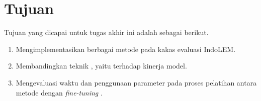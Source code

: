 \section{Tujuan}
\label{sec:tujuan}

Tujuan yang  dicapai untuk tugas akhir ini adalah sebagai berikut.

\begin{enumerate}
    \item Mengimplementasikan berbagai metode \PEFT pada kakas evaluasi IndoLEM.
    \item Membandingkan teknik \PEFT, yaitu \methodPEFT terhadap kinerja model.
    \item Mengevaluasi waktu dan penggunaan parameter pada proses pelatihan antara metode \PEFT dengan \textit{fine-tuning} .
\end{enumerate}
